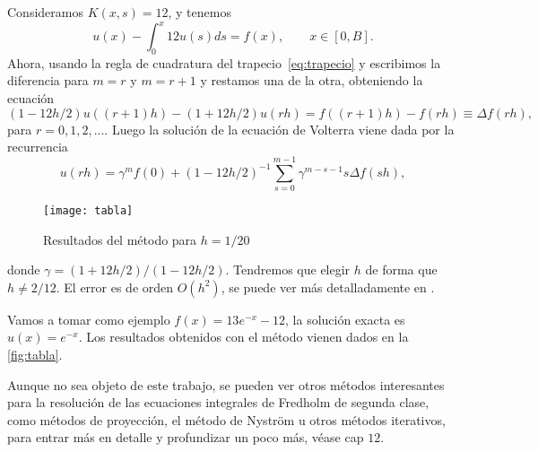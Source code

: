 \begin{ejemplo}
	Consideramos $K(x,s) = 12$, y tenemos
	\begin{equation}
		u(x) - \int_{0}^{x}12u(s)ds = f(x), \qquad x \in [0,B].
	\end{equation}
	Ahora, usando la regla de cuadratura del trapecio~\eqref{eq:trapecio} y escribimos la diferencia para $m = r$ y $m = r+1$ y restamos una de la otra, obteniendo la ecuación
	\begin{equation}
		(1-12h/2)u((r+1)h)-(1+12h/2)u(rh) = f((r+1)h)-f(rh) \equiv \Delta f(rh),
	\end{equation}
	para $r = 0,1,2,... .$ Luego la solución de la ecuación de Volterra viene dada por la recurrencia
	\begin{equation}
		u(rh) = \gamma^m f(0) + (1- 12h/2)^{-1}\sum_{s=0}^{m-1} \gamma^{m-s-1} s\Delta f(sh),
	\end{equation}
	\begin{figure}[h!]
		\centering
		\texttt{[image: tabla]}
		\caption{Resultados del método para $h = 1/20$}
		\label{fig:tabla}
	\end{figure}
	donde $\gamma = (1 + 12h/2)/(1-12h/2)$. Tendremos que elegir $h$ de forma que $h \neq 2/12$. El error es de orden $O(h^2)$, se puede ver más detalladamente en \cite{cuadratura}.
	
	Vamos a tomar como ejemplo $f(x) = 13e^{-x}-12$, la solución exacta es $u(x) = e^{-x}$. Los resultados obtenidos con el método vienen dados en la \autoref{fig:tabla}.
\end{ejemplo}

Aunque no sea objeto de este trabajo, se pueden ver otros métodos interesantes para la resolución de las ecuaciones integrales de Fredholm de segunda clase, como métodos de proyección, el método de Nyström u otros métodos iterativos, para entrar más en detalle y profundizar un poco más, véase \cite{Atkinson} cap $12$.

\endinput
